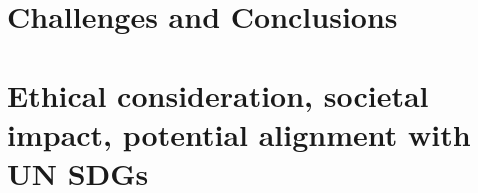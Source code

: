 \documentclass[12pt]{article}
\newcommand{\contentdescription}[1]{}
\begin{document}
    \section{Challenges and Conclusions}
    \contentdescription{
        Challenges and Conclusions (5-15\%):
        Challenges you faced when reimplementing the paper and conducting the experiments.
        Were all details in the paper?
        Or did you have to look in the authors code or even contact them to find about some details?
        Was parts of the code quite hard to get them to work as intended?
        Did you have optimize and tune several hyperparameters?
        Which ones?
        Did the framework you used make the implementation difficult in some ways?

        Summarize your key results - what have you learned?
        What points do you think one should consider when using the approach of the paper you chose for your project?
        Suggest ideas for future extensions or new applications of your ideas.
    }


    \section{Ethical consideration, societal impact, potential alignment with UN SDGs}
    \contentdescription{
        Ethical consideration, societal impact, potential alignment with UN SDGs (5-10\%):
        Think and research!
        Are there any ethical considerations for the original paper, its problem or method, its way of conducting experiments?
        How about your task, your datasets, and the experiments you did?
        What societal impact can you imagine about the original paper and its contributions and results?
        How about your project report?
        How do you think this paper can push the UN SDG targets?
    }
\end{document}
